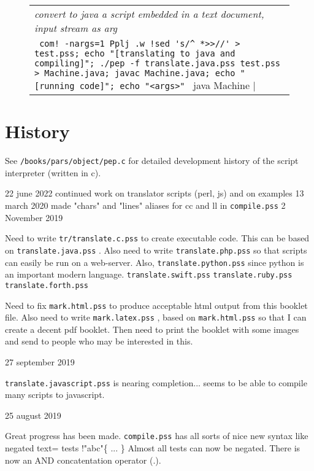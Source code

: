 \documentclass[a4paper,12pt]{article}
\begin{document}
 \begin{figure}
 \begin{tabular}{ l }
 \emph{ convert to java a script embedded in a text document, input stream as arg } \\ 
 \verb| com! -nargs=1 Pplj .w !sed 's/^ *>>//' > test.pss; echo "[translating to java and compiling]"; ./pep -f translate.java.pss test.pss > Machine.java; javac Machine.java; echo "[running code]"; echo "<args>" | java Machine |
 \end{tabular} 
 \end{figure}


\section{History}

  See \texttt{/books/pars/object/pep.c} for detailed development history of the
  script interpreter (written in c).

  22 june 2022
    continued work on translator scripts (perl, js) and on examples
  13 march 2020
    made "chars" and "lines" aliases for cc and ll in \texttt{compile.pss}
  2 November 2019

    Need to write \texttt{tr/translate.c.pss} to create executable code. This
    can be based on \texttt{translate.java.pss} . Also need to write
    \texttt{translate.php.pss} so that scripts can easily be run on a web-server.
    Also, \texttt{translate.python.pss} since python is an important modern
    language. \texttt{translate.swift.pss} \texttt{translate.ruby.pss} \texttt{translate.forth.pss}

    Need to fix \texttt{mark.html.pss} to produce acceptable html output from
    this booklet file. Also need to write \texttt{mark.latex.pss} , based
    on \texttt{mark.html.pss} so that I can create a decent pdf booklet. Then
    need to print the booklet with some images and send to people
    who may be interested in this.

  27 september 2019
   
    \texttt{translate.javascript.pss} is nearing completion... seems to be able
    to compile many scripts to javascript.

  25 august 2019

    Great progress has been made. \texttt{compile.pss} has all sorts of
    nice new syntax like negated text= tests !"abc"\{ ... \}
    Almost all tests can now be negated. There is now an AND concatentation
    operator (.).
\end{document}
